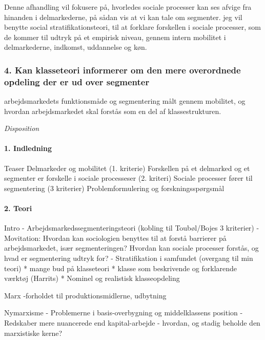 Denne afhandling vil fokusere på, hvorledes sociale processer kan ses afvige fra hinanden i delmarkederne, på sådan vis at vi kan tale om segmenter. jeg vil benytte social stratifikationsteori, til at forklare forskellen i sociale processer, som de kommer til udtryk på et empirisk niveau, gennem intern mobilitet i delmarkederne, indkomst, uddannelse og køn. 


\subsubsection{4. Kan klasseteori informerer om den mere overordnede opdeling der er ud over segmenter}


arbejdsmarkedets funktionsmåde og segmentering målt gennem mobilitet, og hvordan arbejdsmarkedet skal forstås som en del af klassestrukturen. 



\emph{Disposition}


\paragraph{1. Indledning}

	Teaser
	Delmarkeder og mobilitet (1. kriterie)
	Forskellen på et delmarked og et segmenter er forskelle i sociale processeser (2. kriteri)
	Sociale processer fører til segmentering (3 kriterier)
	Problemformulering og forskningsspørgsmål


\paragraph{2. Teori}

	Intro
		- Arbejdsmarkedssegmenteringsteori (kobling til Toubøl/Bojes 3 kriterier)
		- Movitation: Hvordan kan sociologien benyttes til at forstå barrierer på arbejdsmarkedet, især segmenteringen? Hvordan kan sociale processer forstås, og hvad er segmentering udtryk for?
		- Stratifikation i samfundet (overgang til min teori)
			* mange bud på klasseteori
			* klasse som beskrivende og forklarende værktøj (Harrits)
			* Nominel og realistisk klasseopdeling

	Marx
		-forholdet til produktionsmidlerne, udbytning

	Nymarxisme	
		- Problemerne i basis-overbygning og middelklassens position
		- Redskaber mere nuancerede end kapital-arbejde - hvordan, og stadig beholde den marxistiske kerne? 

